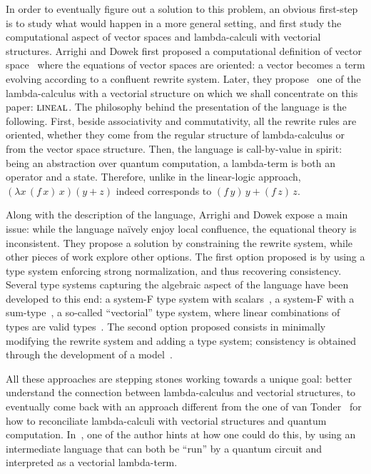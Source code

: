 \documentclass{LMCS}
\newcommand{\olin}{\mbox{\sc lineal}}
\begin{document}
In order to eventually figure out a solution to this problem, an
obvious first-step is to study what would happen in a more general
setting, and first study the computational aspect of vector spaces and
lambda-calculi with vectorial structures. Arrighi and Dowek first
proposed a computational definition of vector
space~\cite{ArrighiDowekWRLA04} where the equations of vector spaces
are oriented: a vector becomes a term evolving according to a
confluent rewrite system. Later, they propose~\cite{ArrighiDowekRTA08}
one of the lambda-calculus with a vectorial structure on which we
shall concentrate on this paper: $\olin$. The philosophy behind the
presentation of the language
is the following. First, beside associativity and commutativity,
all the rewrite rules are oriented, whether they come from the regular
structure of lambda-calculus or from the vector space structure. Then,
the language is call-by-value in spirit: being an abstraction over
quantum computation, a lambda-term is both an operator and a
state. Therefore, unlike in the linear-logic approach, $(\lambda
x\,(f\,x)\,x)(y+z)$ indeed corresponds to $(f\,y)\,y + (f\,z)\,z$.

Along with the description of the language, Arrighi and Dowek expose a
main issue: while the language na\"{i}vely enjoy local confluence, the
equational theory is inconsistent. They propose a solution by
constraining the rewrite system, while other pieces of work explore other
options.
The first option proposed is by using a type system enforcing strong
normalization, and thus recovering consistency. Several type systems
capturing the algebraic aspect of the language have been developed to
this end: a system-F type system with
scalars~\cite{ArrighiDiazcaroQPL09,ArrighiDiazcaroLMCS12}, a system-F
with a
sum-type~\cite{BuirasDiazcaroJaskelioffLSFA11,DiazcaroPetitWoLLIC12},
a so-called ``vectorial'' type system, where linear combinations of
types are valid
types~\cite{ArrighiDiazcaroValironDCM11,ArrighiDiazcaroValiron13}. The
second option proposed consists in minimally modifying the rewrite
system and adding a type system; consistency is obtained through
the development of a model~\cite{ValironDCM10,ValironMSCS13}.

All these approaches are stepping stones working towards a unique goal:
better understand the connection between lambda-calculus and vectorial
structures,
to eventually come back with an approach different from the one of van
Tonder~\cite{vanTonderSIAM04} for how to reconciliate
lambda-calculi with vectorial structures and quantum computation.
In~\cite{ValironQPL10}, one of the author hints at how one could do
this, by using an intermediate language that can both be ``run'' by a
quantum circuit and interpreted as a vectorial lambda-term.
\end{document}
